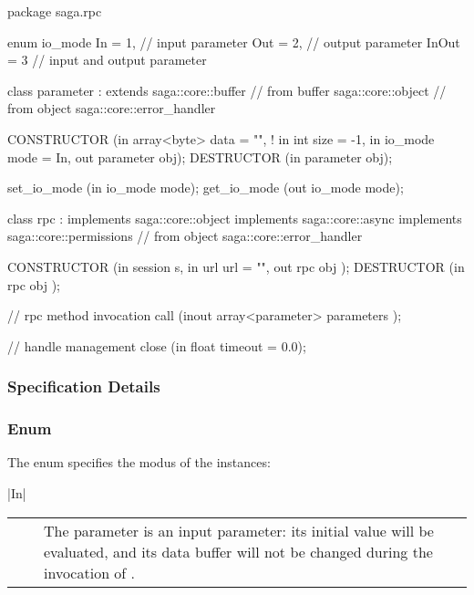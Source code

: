  \begin{myspec}
  package saga.rpc 
  {
    enum io_mode 
    {
      In    = 1,          // input  parameter
      Out   = 2,          // output parameter
      InOut = 3           // input and output parameter
    }
 
    class parameter : extends saga::core::buffer
               // from buffer saga::core::object
               // from object saga::core::error_handler
    {
      CONSTRUCTOR (in    array<byte>       data = "",
!                  in    int               size = -1,
                   in    io_mode           mode = In,
                   out   parameter         obj);
      DESTRUCTOR  (in    parameter         obj);
 
      set_io_mode (in    io_mode           mode);
      get_io_mode (out   io_mode           mode);
    }
 
    class rpc : implements   saga::core::object
                implements   saga::core::async   
                implements   saga::core::permissions
             // from object  saga::core::error_handler
    {
      CONSTRUCTOR (in    session           s,
                   in    url               url = "", 
                   out   rpc               obj          );
      DESTRUCTOR  (in    rpc               obj          );
 
      // rpc method invocation
      call        (inout array<parameter>  parameters   );
 
      // handle management
      close       (in    float             timeout = 0.0);
    }
  }
 \end{myspec}
 
 \subsubsection{Specification Details}
 
  \subsubsection*{Enum }
 
   The  enum specifies the modus of the
    instances:
 
   |In|\\[1.5mm]
   \begin{tabular}{cp{110mm}}
     ~~ & The parameter is an input parameter: its initial
          value will be evaluated, and its data buffer will
          not be changed during the invocation of \T{call()}.
   \end{tabular}
 
